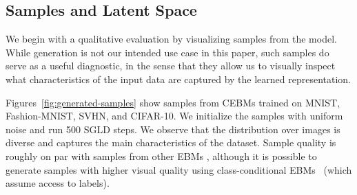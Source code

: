 \documentclass{article}
\begin{document}




\vspace*{-1.0ex}
\subsection{Samples and Latent Space}
\label{sec:exp:quality}
\vspace*{-1.0ex}

We begin with a qualitative evaluation by visualizing samples from the model. 
While generation is not our intended use case in this paper, such samples do serve as a useful diagnostic, in the sense that they allow us to visually inspect what characteristics of the input data are captured by the learned representation. 

Figures~\ref{fig:generated-samples} show samples from CEBMs trained on MNIST, Fashion-MNIST, SVHN, and CIFAR-10. We initialize the samples with uniform noise and run 500 SGLD steps. We observe that the distribution over images is diverse and captures the main characteristics of the dataset. Sample quality is roughly on par with samples from other EBMs \cite{nijkamp2019anatomy}, although it is possible to generate samples with higher visual quality using class-conditional EBMs~\cite{du2019implicit, grathwohl2019your, liu2020hybrid} (which assume access to labels).

\end{document}
